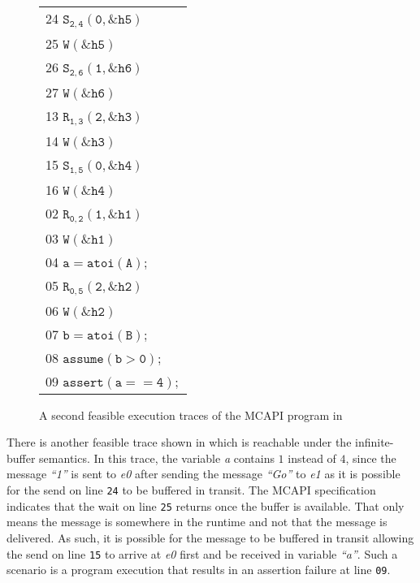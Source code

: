 \begin{figure}[t]
\begin{center}
\setlength{\tabcolsep}{2pt}
\scriptsize \begin{tabular}[t]{l}
24 $\mathtt{S_{2,4}(0,\&h5)}$ \\
25 $\mathtt{W(\&h5)}$ \\
26 $\mathtt{S_{2,6}(1,\&h6)}$ \\
27 $\mathtt{W(\&h6)}$ \\
\hline
13 $\mathtt{R_{1,3}(2,\&h3)}$ \\
14 $\mathtt{W(\&h3)}$ \\
15 $\mathtt{S_{1,5}(0,\&h4)}$ \\
16 $\mathtt{W(\&h4)}$ \\
\hline
02 $\mathtt{R_{0,2}(1,\&h1)}$ \\
03 $\mathtt{W(\&h1)}$ \\
04 $\mathtt{a = atoi(A);}$ \\
05 $\mathtt{R_{0,5}(2,\&h2)}$\\
06 $\mathtt{W(\&h2)}$ \\
07 $\mathtt{b = atoi(B);}$ \\
08 $\mathtt{assume (b > 0);}$ \\
09 $\mathtt{assert(a == 4);}$ \\
\hline
\end{tabular}
\end{center}
\caption{A second feasible  execution traces of the MCAPI program in }
\label{fig:trace2}
\end{figure}

There is another feasible trace shown in
 which is reachable under the infinite-buffer
semantics. In this trace, the variable \textit{a} contains $1$ instead
of $4$, since the message \textit{``1''} is sent to \textit{e0} after
sending the message \textit{``Go''} to \textit{e1} as it is possible
for the send on line \texttt{24} to be buffered in transit. The MCAPI
specification indicates that the wait on line \texttt{25} returns once
the buffer is available. That only means the message is somewhere in
the runtime and not
that the message is delivered. As such, it is possible for the message
to be buffered in transit allowing the send on line \texttt{15}
to arrive at \textit{e0} first and be received in variable
\textit{``a''}. Such a scenario is a program execution that results in
an assertion failure at line \texttt{09}.

